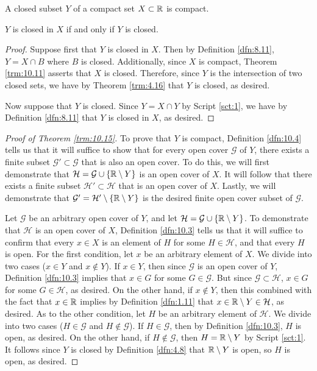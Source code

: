 \documentclass[../main.tex]{subfiles}
\begin{document}
\begin{theorem}\label{trm:10.15}
    A closed subset $Y$ of a compact set $X\subset\mathbb{R}$ is compact.
    \begin{lemma*}
        $Y$ is closed in $X$ if and only if $Y$ is closed.
        \begin{proof}
            Suppose first that $Y$ is closed in $X$. Then by Definition \ref{dfn:8.11}, $Y=X\cap B$ where $B$ is closed. Additionally, since $X$ is compact, Theorem \ref{trm:10.11} asserts that $X$ is closed. Therefore, since $Y$ is the intersection of two closed sets, we have by Theorem \ref{trm:4.16} that $Y$ is closed, as desired.\par
            Now suppose that $Y$ is closed. Since $Y=X\cap Y$ by Script \ref{sct:1}, we have by Definition \ref{dfn:8.11} that $Y$ is closed in $X$, as desired.
        \end{proof}
    \end{lemma*}
    \begin{proof}[Proof of Theorem \ref{trm:10.15}]
        To prove that $Y$ is compact, Definition \ref{dfn:10.4} tells us that it will suffice to show that for every open cover $\mathcal{G}$ of $Y$, there exists a finite subset $\mathcal{G}'\subset\mathcal{G}$ that is also an open cover. To do this, we will first demonstrate that $\mathcal{H}=\mathcal{G}\cup\{\mathbb{R}\setminus Y\}$ is an open cover of $X$. It will follow that there exists a finite subset $\mathcal{H}'\subset\mathcal{H}$ that is an open cover of $X$. Lastly, we will demonstrate that $\mathcal{G}'=\mathcal{H}'\setminus\{\mathbb{R}\setminus Y\}$ is the desired finite open cover subset of $\mathcal{G}$.\par\smallskip
        Let $\mathcal{G}$ be an arbitrary open cover of $Y$, and let $\mathcal{H}=\mathcal{G}\cup\{\mathbb{R}\setminus Y\}$. To demonstrate that $\mathcal{H}$ is an open cover of $X$, Definition \ref{dfn:10.3} tells us that it will suffice to confirm that every $x\in X$ is an element of $H$ for some $H\in\mathcal{H}$, and that every $H$ is open. For the first condition, let $x$ be an arbitrary element of $X$. We divide into two cases ($x\in Y$ and $x\notin Y$). If $x\in Y$, then since $\mathcal{G}$ is an open cover of $Y$, Definition \ref{dfn:10.3} implies that $x\in G$ for some $G\in\mathcal{G}$. But since $\mathcal{G}\subset\mathcal{H}$, $x\in G$ for some $G\in\mathcal{H}$, as desired. On the other hand, if $x\notin Y$, then this combined with the fact that $x\in\mathbb{R}$ implies by Definition \ref{dfn:1.11} that $x\in\mathbb{R}\setminus Y\in\mathcal{H}$, as desired. As to the other condition, let $H$ be an arbitrary element of $\mathcal{H}$. We divide into two cases ($H\in\mathcal{G}$ and $H\notin\mathcal{G}$). If $H\in\mathcal{G}$, then by Definition \ref{dfn:10.3}, $H$ is open, as desired. On the other hand, if $H\notin\mathcal{G}$, then $H=\mathbb{R}\setminus Y$ by Script \ref{sct:1}. It follows since $Y$ is closed by Definition \ref{dfn:4.8} that $\mathbb{R}\setminus Y$ is open, so $H$ is open, as desired.\par

\end{proof}
\end{theorem}
\end{document}
